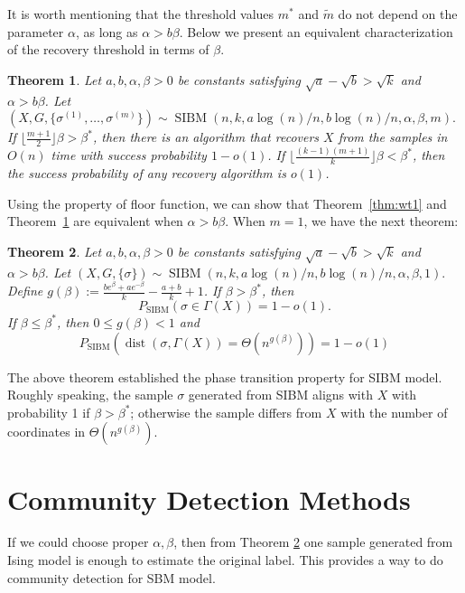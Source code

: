\label{key}\documentclass[conference]{IEEEtran}
\newtheorem{theorem}{Theorem}%
\DeclareMathOperator{\SIBM}{SIBM}
\DeclareMathOperator{\dist}{dist}
\begin{document}
It is worth mentioning that the threshold values $m^\ast$ and $\tilde{m}$ do not depend on the parameter $\alpha$, as long as $\alpha>b\beta$.
Below we present an equivalent characterization of the recovery threshold in terms of $\beta$.
\begin{theorem} \label{thm:wt2}
	Let $a,b,\alpha,\beta> 0$ be constants satisfying $\sqrt{a}-\sqrt{b} > \sqrt{k}$ and $\alpha>b\beta$. 
	Let 
	$
	(X,G,\{\sigma^{(1)},\dots,\sigma^{(m)}\}) \sim \SIBM(n, k, a\log(n)/n, b\log(n)/n,\alpha,\beta,m).
	$
	If $\lfloor \frac{m+1}{2} \rfloor \beta>\beta^\ast$, then there is an algorithm that recovers $X$ from the samples in $O(n)$ time with success probability $1-o(1)$. If $\lfloor \frac{(k-1)(m+1)}{k} \rfloor \beta <\beta^\ast$, then the success probability of any recovery algorithm is $o(1)$. 
\end{theorem}
Using the property of floor function, we can show that Theorem~\ref{thm:wt1} and Theorem~\ref{thm:wt2} are equivalent when $\alpha > b \beta$.
When $m=1$, we have the next theorem:

\begin{theorem}  \label{thm:wt3}
Let $a,b,\alpha,\beta> 0$ be constants satisfying $\sqrt{a}-\sqrt{b} > \sqrt{k}$ and $\alpha>b\beta$.
Let 
$
(X,G,\{\sigma\}) \sim \SIBM(n,k, a\log(n)/n, b\log(n)/n,\alpha,\beta,1).
$
Define $g(\beta)  := \frac{b e^{\beta}+a e^{-\beta}}{k}-\frac{a+b}{k}+1$.
If $\beta>\beta^\ast$, then
$$
P_{\SIBM}(\sigma \in \Gamma(X)) = 1-o(1).
$$
If $\beta\le \beta^\ast$, then $0\leq g(\beta) < 1$ and
$$
P_{\SIBM}(\dist(\sigma, \Gamma(X))= \Theta(n^{g(\beta)})) = 1-o(1)
$$
\end{theorem}

The above theorem established the phase transition property for SIBM model.
Roughly speaking, the sample $\sigma$ generated from SIBM aligns with $X$ with probability 1 if $\beta > \beta^*$;
otherwise the sample differs from $X$ with the number of coordinates in $\Theta(n^{g(\beta)})$.
\section{Community Detection Methods}

If we could choose proper $\alpha, \beta$, then from Theorem \ref{thm:wt3} one sample generated from Ising model is enough to
estimate the original label. This provides a way to do community detection for SBM model.
\end{document}
